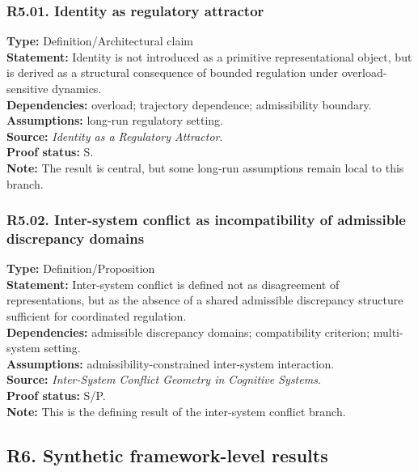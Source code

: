 \documentclass[12pt]{article}
\begin{document}
	\subsubsection*{R5.01. Identity as regulatory attractor}
	\textbf{Type:} Definition/Architectural claim \\
	\textbf{Statement:} Identity is not introduced as a primitive representational object, but is
	derived as a structural consequence of bounded regulation under overload-sensitive dynamics. \\
	\textbf{Dependencies:} overload; trajectory dependence; admissibility boundary. \\
	\textbf{Assumptions:} long-run regulatory setting. \\
	\textbf{Source:} \emph{Identity as a Regulatory Attractor}. \\
	\textbf{Proof status:} S. \\
	\textbf{Note:} The result is central, but some long-run assumptions remain local to this branch.
	
	\subsubsection*{R5.02. Inter-system conflict as incompatibility of admissible discrepancy domains}
	\textbf{Type:} Definition/Proposition \\
	\textbf{Statement:} Inter-system conflict is defined not as disagreement of representations, but
	as the absence of a shared admissible discrepancy structure sufficient for coordinated regulation. \\
	\textbf{Dependencies:} admissible discrepancy domains; compatibility criterion; multi-system setting. \\
	\textbf{Assumptions:} admissibility-constrained inter-system interaction. \\
	\textbf{Source:} \emph{Inter-System Conflict Geometry in Cognitive Systems}. \\
	\textbf{Proof status:} S/P. \\
	\textbf{Note:} This is the defining result of the inter-system conflict branch.
	
	\subsection{R6. Synthetic framework-level results}
	
\end{document}

